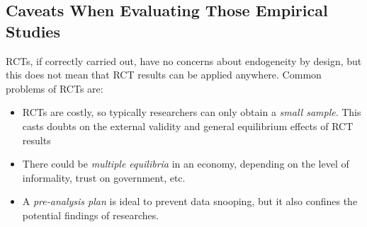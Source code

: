     \subsection{Caveats When Evaluating Those Empirical Studies}
        RCTs, if correctly carried out, have no concerns about endogeneity by design, but this does not mean that RCT results can be applied anywhere. Common problems of RCTs are:
        \begin{itemize}
            \item RCTs are costly, so typically researchers can only obtain a \emph{small sample}. This casts doubts on the external validity and general equilibrium effects of RCT results
            \item There could be \emph{multiple equilibria} in an economy, depending on the level of informality, trust on government, etc.
            \item A \emph{pre-analysis plan} is ideal to prevent data snooping, but it also confines the potential findings of researches.
        \end{itemize}
